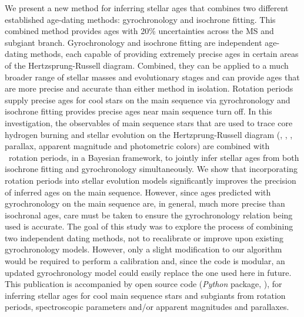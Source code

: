 We present a new method for inferring stellar ages that combines two different
established age-dating methods: gyrochronology and isochrone fitting.
This combined method provides ages with 20\% uncertainties across the MS and
subgiant branch.
Gyrochronology and isochrone fitting are independent age-dating methods, each
capable of providing extremely precise ages in certain areas of the
Hertzsprung-Russell diagram.
Combined, they can be applied to a much broader range of stellar masses and
evolutionary stages and can provide ages that are more precise and accurate
than either method in isolation.
Rotation periods supply precise ages for cool stars on the main sequence via
gyrochronology and isochrone fitting provides precise ages near main sequence
turn off.
In this investigation, the observables of main sequence stars that are used to
trace core hydrogen burning and stellar evolution on the Hertzprung-Russell
diagram (\teff, \feh, \logg, parallax, apparent magnitude and photometric
colors) are combined with \kepler\ rotation periods, in a Bayesian framework,
to jointly infer stellar ages from both isochrone fitting and gyrochronology
simultaneously.
We show that incorporating rotation periods into stellar evolution models
significantly improves the precision of inferred ages on the main sequence.
However, since ages predicted with gyrochronology on the main sequence are, in
general, much more precise than isochronal ages, care must be taken to ensure
the gyrochronology relation being used is accurate.
The goal of this study was to explore the process of combining two independent
dating methods, not to recalibrate or improve upon existing gyrochronology
models.
However, only a slight modification to our algorithm would be required to
perform a calibration and, since the code is modular, an updated
gyrochronology model could easily replace the one used here in future.
This publication is accompanied by open source code ({\it Python} package,
\sd), for inferring stellar ages for cool main sequence stars and subgiants
from rotation periods, spectroscopic parameters and/or apparent magnitudes and
parallaxes.
